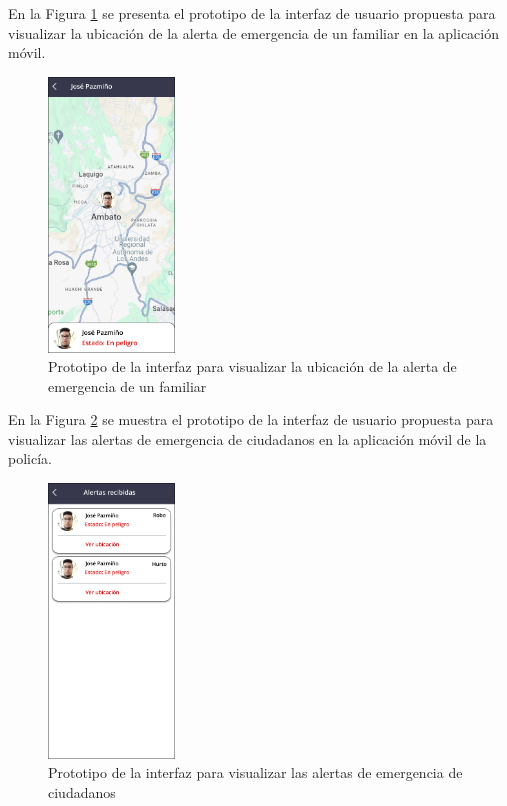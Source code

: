 En la Figura \ref{fig:prototipo-ubicacion-alerta-mobile} se presenta el prototipo de la interfaz de usuario propuesta para
visualizar la ubicación de la alerta de emergencia de un familiar en la aplicación móvil.

\begin{figure}[H]
      \centering
      \includegraphics[width=0.3\textwidth]{chapters/III-resultados-y-discusion/resources/images/prototipo-ubicacion-alerta-mobile.png}
      \caption{Prototipo de la interfaz para visualizar la ubicación de la alerta de emergencia de un familiar}
      \label{fig:prototipo-ubicacion-alerta-mobile}
\end{figure}

En la Figura \ref{fig:prototipo-alertas-policia} se muestra el prototipo de la interfaz de usuario propuesta para
visualizar las alertas de emergencia de ciudadanos en la aplicación móvil de la policía.

\begin{figure}[H]
      \centering
      \includegraphics[width=0.3\textwidth]{chapters/III-resultados-y-discusion/resources/images/prototipo-alertas-policia.png}
      \caption{Prototipo de la interfaz para visualizar las alertas de emergencia de ciudadanos}
      \label{fig:prototipo-alertas-policia}
\end{figure}

